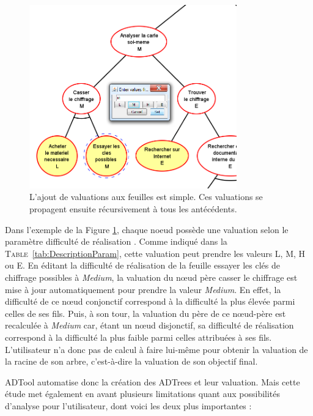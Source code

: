 	\begin{figure}[h]
        \centering
        \includegraphics[width=0.8\textwidth]{figure/adtool_add_values.png}
        \caption{L'ajout de valuations aux feuilles est simple. Ces valuations se propagent ensuite récursivement à tous les antécédents.}
        \label{fig:arbre_exemple_2}
    \end{figure}
	
	Dans l'exemple de la {\sc Figure} \ref{fig:arbre_exemple_2}, chaque noeud possède une valuation selon le paramètre \og difficulté de réalisation \fg{}. Comme indiqué dans la \textsc{Table}~\ref{tab:DescriptionParam}, cette valuation peut prendre les valeurs L, M, H ou E. En éditant la difficulté de réalisation de la feuille \og essayer les clés de chiffrage possibles \fg{} à \emph{Medium}, la valuation du nœud père \og casser le chiffrage \fg{} est mise à jour automatiquement pour prendre la valeur \emph{Medium}. En effet, la difficulté de ce nœud conjonctif correspond à la difficulté la plus élevée parmi celles de ses fils. Puis, à son tour, la valuation du père de ce nœud-père est recalculée à \emph{Medium} car, étant un nœud disjonctif, sa difficulté de réalisation correspond à la difficulté la plus faible parmi celles attribuées à ses fils. L'utilisateur n'a donc pas de calcul à faire lui-même pour obtenir la valuation de la racine de son arbre, c'est-à-dire la valuation de son objectif final. 

	ADTool automatise donc la création des ADTrees et leur valuation. Mais cette étude met également en avant plusieurs limitations quant aux possibilités d'analyse pour l'utilisateur, dont voici les deux plus importantes :  

